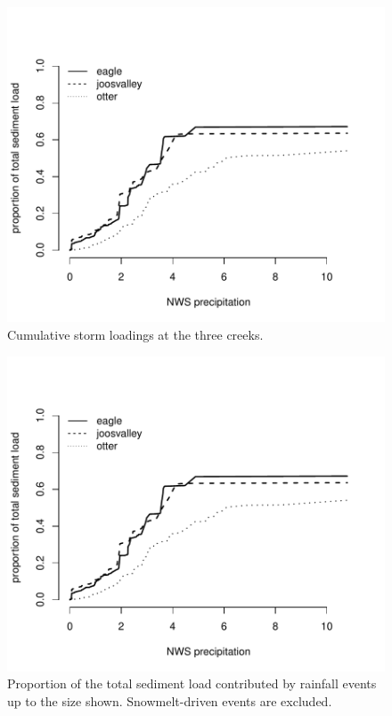 \documentclass[12pt]{article}
\begin{document}
\begin{figure}
    \begin{center}
\includegraphics{loadings-figure1}
    \end{center}
    \caption{Cumulative storm loadings at the three creeks.\label{cdf}}
\end{figure}


\begin{figure}
    \begin{center}
\includegraphics{loadings-figure1}
    \end{center}
    \caption{Proportion of the total sediment load contributed by rainfall events up to the size shown. Snowmelt-driven events are excluded.\label{cdf}}
\end{figure}
\end{document}
